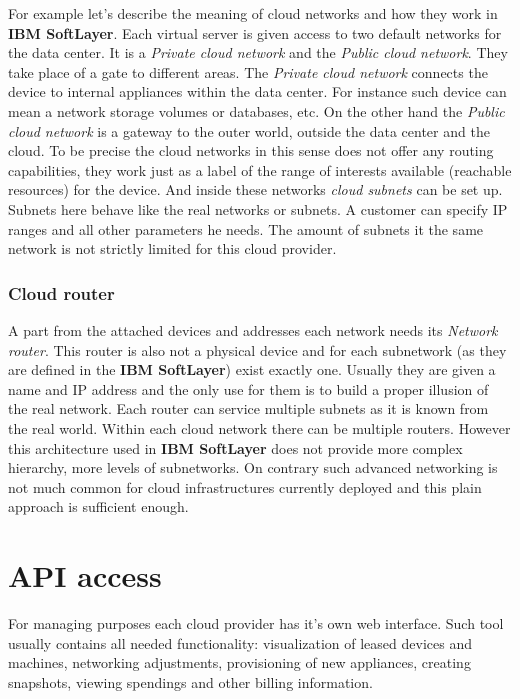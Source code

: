 For example let's describe the meaning of cloud networks and how they work in \textbf{IBM SoftLayer}. Each virtual server is given access to two default networks for the data center. It is a \emph{Private cloud network} and the \emph{Public cloud network}. They take place of a gate to different areas. The \emph{Private cloud network} connects the device to internal appliances within the data center. For instance such device can mean a network storage volumes or databases, etc. On the other hand the \emph{Public cloud network} is a gateway to the outer world, outside the data center and the cloud. To be precise the cloud networks in this sense does not offer any routing capabilities, they work just as a label of the range of interests available (reachable resources) for the device. And inside these networks \emph{cloud subnets} can be set up. Subnets here behave like the real networks or subnets. A customer can specify IP ranges and all other parameters he needs. The amount of subnets it the same network is not strictly limited for this cloud provider.

\subsubsection{Cloud router}
\label{subs:Cloud router}

A part from the attached devices and addresses each network needs its \emph{Network router}. This router is also not a physical device and for each subnetwork (as they are defined in the \textbf{IBM SoftLayer}) exist exactly one. Usually they are given a name and IP address and the only use for them is to build a proper illusion of the real network. Each router can service multiple subnets as it is known from the real world. Within each cloud network there can be multiple routers. However this architecture used in \textbf{IBM SoftLayer} does not provide more complex hierarchy, more levels of subnetworks. On contrary such advanced networking is not much common for cloud infrastructures currently deployed and this plain approach is sufficient enough.

\section{API access}
\label{sec:API access}

For managing purposes each cloud provider has it's own web interface. Such tool usually contains all needed functionality: visualization of leased devices and machines, networking adjustments, provisioning of new appliances, creating snapshots, viewing spendings and other billing information.

